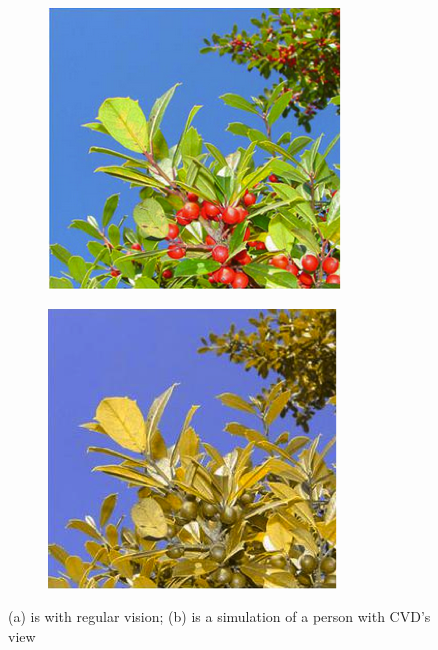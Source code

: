 \documentclass[10pt,twocolumn,letterpaper]{article}
\begin{document}
\begin{figure}[h]
  \centering
  \begin{subfigure}{0.22\textwidth}
    \includegraphics[width=\textwidth]{grapes1.png}
    \caption{}
  \end{subfigure}
  \begin{subfigure}{0.22\textwidth}
    \includegraphics[width=\textwidth]{grapes2.png}
    \caption{}
  \end{subfigure}
  \caption{(a) is with regular vision; (b) is a simulation of a person with CVD's view}
  \label{fig:grapes}
\end{figure}
\end{document}
